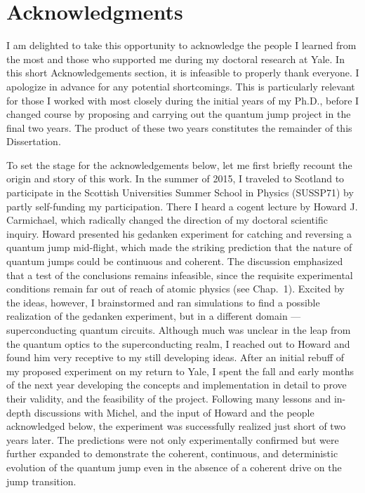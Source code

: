 \chapter*{Acknowledgments}
\doublespacing

\noindent\lettrine{I}{} am delighted to take this opportunity to acknowledge the people I learned from the most and those who supported me during my doctoral research at Yale. In this short Acknowledgements section, it is infeasible to properly thank everyone. I apologize in advance for any potential shortcomings. This is particularly relevant for those I worked with most closely during the initial years of my Ph.D., before I changed course by proposing and carrying out the quantum jump project in the final two years. The product of these two years constitutes the remainder of this Dissertation. 

To set the stage for the acknowledgements below, let me first briefly recount the origin and story of this work. In the summer of 2015, I traveled to Scotland to participate in the Scottish Universities Summer School in Physics (SUSSP71) by partly self-funding my participation. There I heard a cogent lecture by Howard J. Carmichael, which radically changed the direction of my doctoral scientific inquiry. Howard presented his gedanken experiment for catching and reversing a quantum jump mid-flight, which made the striking prediction that the nature of quantum jumps could be continuous and coherent. The discussion emphasized that a test of the conclusions remains infeasible, since the requisite experimental conditions remain far out of reach of atomic physics (see Chap.~1). Excited by the ideas, however, I brainstormed and ran simulations to find a possible realization of the gedanken experiment, but in a different domain --- superconducting quantum circuits. Although much was unclear in the leap from the quantum optics to the superconducting realm, I reached out to Howard and found him very receptive to my still developing ideas.  After an initial rebuff of my proposed experiment on my return to Yale, I spent the fall and early months of the next year developing the concepts and implementation in detail to prove their validity, and the feasibility of the project. Following many lessons and in-depth discussions with Michel, and the input of Howard and the people acknowledged below, the experiment was successfully realized just short of two years later. The predictions were not only experimentally confirmed but were further expanded to demonstrate the coherent, continuous, and deterministic evolution of the quantum jump even in the absence of a coherent drive on the jump transition. 

